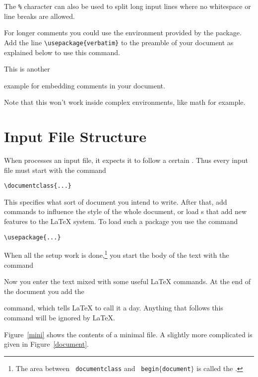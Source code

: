 The \texttt{\%} character can also be used to split long input lines where no
whitespace or line breaks are allowed.

For longer comments you could use the  environment
provided by the  package. Add the
line \verb|\usepackage{verbatim}| to the preamble of your document as
explained below to use this command.

\begin{example}
This is another
\begin{comment}
rather stupid,
but helpful
\end{comment}
example for embedding
comments in your document.
\end{example}

Note that this won't work inside complex environments, like math for example.

\section{Input File Structure}\label{sec:structure}
When \LaTeXe{} processes an input file, it expects it to follow a
certain . Thus every input file must start with the
command
\begin{code}
\verb|\documentclass{...}|
\end{code}
This specifies what sort of document you intend to write. After that,
add commands to influence the style of the whole
document, or load s that add new
features to the \LaTeX{} system. To load such a package you use the
command
\begin{code}
\verb|\usepackage{...}|
\end{code}

When all the setup work is done,\footnote{The area between \texttt{\bs{}
    documentclass} and \texttt{\bs{}
    begin$\mathtt{\{}$document$\mathtt{\}}$} is called the
  \emph{}.} you start the body of the text with the
command

\begin{code}
\verb||
\end{code}

Now you enter the text mixed with some useful \LaTeX{} commands.  At
the end of the document you add the
\begin{code}
\verb||
\end{code}
command, which tells \LaTeX{} to call it a day. Anything that
follows this command will be ignored by \LaTeX.

Figure~\ref{mini} shows the contents of a minimal \LaTeXe{} file. A
slightly more complicated  is given in
Figure~\ref{document}.

